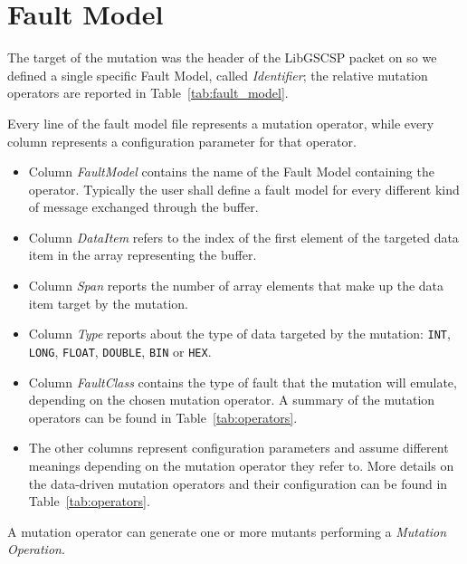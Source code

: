 \section{Fault Model}

The target of the mutation was the header of the LibGSCSP packet on so we defined a single specific Fault Model, called \emph{Identifier}; the relative mutation operators are reported in Table~\ref{tab:fault_model}.



Every line of the fault model file represents a mutation operator, while every column represents a configuration parameter for that operator.

\begin{itemize}
  \item Column \emph{FaultModel} contains the name of the Fault Model containing the operator. Typically the user shall define a fault model for every different kind of message exchanged through the buffer.

  \item Column \emph{DataItem} refers to the index of the first element of the targeted data item in the array representing the buffer.

  \item Column \emph{Span} reports the number of array elements that make up the data item target by the mutation.

  \item Column \emph{Type} reports about the type of data targeted by the mutation: \texttt{INT}, \texttt{LONG}, \texttt{FLOAT}, \texttt{DOUBLE}, \texttt{BIN} or \texttt{HEX}.

  \item Column \emph{FaultClass} contains the type of fault that the mutation will emulate, depending on the chosen mutation operator. A summary of the mutation operators can be found in Table~\ref{tab:operators}.

  \item The other columns represent configuration parameters and assume different meanings depending on the mutation operator they refer to. More details on the data-driven mutation operators and their configuration can be found in Table~\ref{tab:operators}.

\end{itemize}



A mutation operator can generate one or more mutants performing a \emph{Mutation Operation}.
